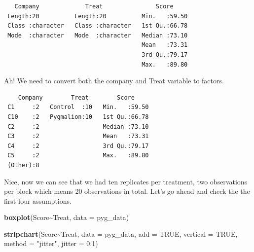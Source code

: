 \documentclass[
  letterpaper,
]{book}
\newenvironment{Shaded}{\begin{snugshade}}{\end{snugshade}}
\newcommand{\AttributeTok}[1]{\textcolor[rgb]{0.13,0.29,0.53}{#1}}
\newcommand{\ConstantTok}[1]{\textcolor[rgb]{0.56,0.35,0.01}{#1}}
\newcommand{\FloatTok}[1]{\textcolor[rgb]{0.00,0.00,0.81}{#1}}
\newcommand{\FunctionTok}[1]{\textcolor[rgb]{0.13,0.29,0.53}{\textbf{#1}}}
\newcommand{\NormalTok}[1]{#1}
\newcommand{\OtherTok}[1]{\textcolor[rgb]{0.56,0.35,0.01}{#1}}
\newcommand{\SpecialCharTok}[1]{\textcolor[rgb]{0.81,0.36,0.00}{\textbf{#1}}}
\newcommand{\StringTok}[1]{\textcolor[rgb]{0.31,0.60,0.02}{#1}}
\begin{document}
\begin{verbatim}
   Company             Treat               Score      
 Length:20          Length:20          Min.   :59.50  
 Class :character   Class :character   1st Qu.:66.78  
 Mode  :character   Mode  :character   Median :73.10  
                                       Mean   :73.31  
                                       3rd Qu.:79.17  
                                       Max.   :89.80  
\end{verbatim}

Ah! We need to convert both the company and Treat variable to factors.

\begin{Shaded}
\end{Shaded}

\begin{verbatim}
    Company        Treat        Score      
 C1     :2   Control  :10   Min.   :59.50  
 C10    :2   Pygmalion:10   1st Qu.:66.78  
 C2     :2                  Median :73.10  
 C3     :2                  Mean   :73.31  
 C4     :2                  3rd Qu.:79.17  
 C5     :2                  Max.   :89.80  
 (Other):8                                 
\end{verbatim}

Nice, now we can see that we had ten replicates per treatment, two
observations per block which means 20 observations in total. Let's go
ahead and check the the first four assumptions.

\begin{Shaded}
\begin{Highlighting}[]
\FunctionTok{boxplot}\NormalTok{(Score}\SpecialCharTok{\textasciitilde{}}\NormalTok{Treat, }\AttributeTok{data =}\NormalTok{ pyg\_data)}

\FunctionTok{stripchart}\NormalTok{(Score}\SpecialCharTok{\textasciitilde{}}\NormalTok{Treat, }\AttributeTok{data =}\NormalTok{ pyg\_data, }\AttributeTok{add =} \ConstantTok{TRUE}\NormalTok{, }\AttributeTok{vertical =} \ConstantTok{TRUE}\NormalTok{, }\AttributeTok{method =} \StringTok{"jitter"}\NormalTok{, }\AttributeTok{jitter =} \FloatTok{0.1}\NormalTok{)}
\end{Highlighting}
\end{Shaded}
\end{document}
